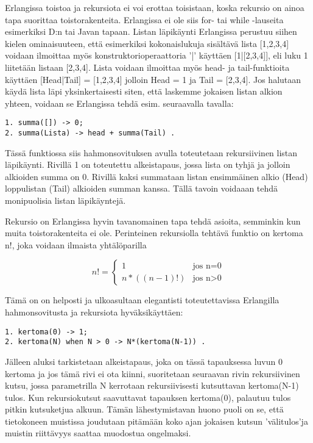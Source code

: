 \documentclass[11pt,oneside,a4paper]{article}
\begin{document}
Erlangissa toistoa ja rekursiota ei voi erottaa toisistaan, koska rekursio on
ainoa tapa suorittaa toistorakenteita. Erlangissa ei ole siis for- tai while
-lauseita esimerkiksi D:n tai Javan tapaan. Listan läpikäynti Erlangissa perustuu
siihen kielen ominaisuuteen, että
esimerkiksi kokonaislukuja sisältävä lista [1,2,3,4]  voidaan ilmoittaa myös
konstruktorioperaattoria '|' käyttäen [1|[2,3,4]], eli luku 1 liitetään listaan
[2,3,4]. Lista voidaan ilmoittaa myös head- ja tail-funktioita käyttäen
[Head|Tail] = [1,2,3,4] jolloin Head = 1 ja Tail = [2,3,4].
Jos halutaan käydä lista läpi yksinkertaisesti siten, että laskemme jokaisen
listan alkion yhteen, voidaan se Erlangissa tehdä esim. seuraavalla tavalla:

\begin{verbatim}
1. summa([]) -> 0;
2. summa(Lista) -> head + summa(Tail) .  
\end{verbatim}


Tässä funktiossa siis hahmonsovituksen avulla toteutetaan rekursiivinen listan
läpikäynti. Rivillä 1 on toteutettu alkeistapaus, jossa lista on tyhjä ja
jolloin alkioiden summa on 0. Rivillä kaksi summataan listan ensimmäinen alkio
(Head) loppulistan 
(Tail) alkioiden summan kanssa. Tällä tavoin voidaaan tehdä monipuolisia listan
läpikäyntejä. 

Rekursio on Erlangissa hyvin tavanomainen tapa tehdä asioita, semminkin kun muita
toistorakenteita ei ole. Perinteinen rekursiolla tehtävä funktio on kertoma n!,
joka voidaan ilmaista yhtälöparilla 

\begin{displaymath}
n! = \left\{ \begin{array}{ll}
1 & \textrm{jos n=0}\\
n*((n-1)!) & \textrm{{jos n>0}}
\end{array} \right.
\end{displaymath}

Tämä on on helposti ja ulkoasultaan elegantisti toteutettavissa Erlangilla
hahmonsovitusta ja rekursiota hyväksikäyttäen:
\begin{verbatim}
1. kertoma(0) -> 1;
2. kertoma(N) when N > 0 -> N*(kertoma(N-1)) .
\end{verbatim}
Jälleen aluksi tarkistetaan alkeistapaus, joka on tässä tapauksessa luvun 0
kertoma ja jos tämä rivi ei ota kiinni, suoritetaan seuraavan rivin
rekursiivinen kutsu, jossa parametrilla N kerrotaan rekursiivisesti kutsuttavan
kertoma(N-1) tulos.
Kun rekursiokutsut saavuttavat tapauksen kertoma(0), palautuu tulos pitkin
kutsuketjua alkuun. Tämän lähestymistavan huono puoli on se, että tietokoneen
muistissa joudutaan pitämään koko ajan jokaisen kutsun 'välitulos'ja muistin riittävyys saattaa muodostua ongelmaksi. 
\end{document}
